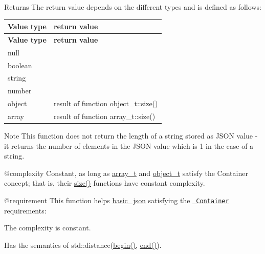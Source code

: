 \begin{DoxyReturn}{Returns}
The return value depends on the different types and is defined as follows\+: \tabulinesep=1mm
\begin{longtabu}spread 0pt [c]{*{2}{|X[-1]}|}
\hline
\PBS\centering \cellcolor{\tableheadbgcolor}\textbf{ Value type  }&\PBS\centering \cellcolor{\tableheadbgcolor}\textbf{ return value   }\\
\endfirsthead
\hline
\endfoot
\hline
\PBS\centering \cellcolor{\tableheadbgcolor}\textbf{ Value type  }&\PBS\centering \cellcolor{\tableheadbgcolor}\textbf{ return value   }\\
\endhead
null  &{}   \\
boolean  &{}   \\
string  &{}   \\
number  &{}   \\
object  &result of function object\+\_\+t\+::size()   \\
array  &result of function array\+\_\+t\+::size()   \\
\end{longtabu}

\end{DoxyReturn}
\begin{DoxyNote}{Note}
This function does not return the length of a string stored as J\+S\+ON value -\/ it returns the number of elements in the J\+S\+ON value which is 1 in the case of a string.
\end{DoxyNote}
@complexity Constant, as long as \mbox{\hyperlink{classnlohmann_1_1basic__json_ae095578e03df97c5b3991787f1056374}{array\+\_\+t}} and \mbox{\hyperlink{classnlohmann_1_1basic__json_aa1eb13d5aa86f80cbee6c58e90fbaf49}{object\+\_\+t}} satisfy the Container concept; that is, their \mbox{\hyperlink{classnlohmann_1_1basic__json_a25e27ad0c6d53c01871c5485e1f75b96}{size()}} functions have constant complexity.

@requirement This function helps {\ttfamily \mbox{\hyperlink{classnlohmann_1_1basic__json}{basic\+\_\+json}}} satisfying the \href{http://en.cppreference.com/w/cpp/concept/Container}{\texttt{ Container}} requirements\+:
\begin{DoxyItemize}
\item The complexity is constant.
\item Has the semantics of {\ttfamily std\+::distance(\mbox{\hyperlink{classnlohmann_1_1basic__json_a0ff28dac23f2bdecee9564d07f51dcdc}{begin()}}, \mbox{\hyperlink{classnlohmann_1_1basic__json_a13e032a02a7fd8a93fdddc2fcbc4763c}{end()}})}.
\end{DoxyItemize}

